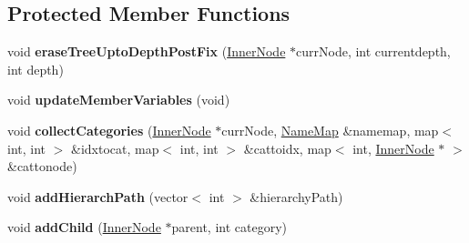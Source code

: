 \subsection*{Protected Member Functions}
\begin{DoxyCompactItemize}
\item 
\hypertarget{classMultiBoost_1_1ClassHierarchy_a558e78fc8235af81be08a48c0720ec46}{void {\bfseries erase\-Tree\-Upto\-Depth\-Post\-Fix} (\hyperlink{classMultiBoost_1_1InnerNode}{Inner\-Node} $\ast$curr\-Node, int currentdepth, int depth)}\label{classMultiBoost_1_1ClassHierarchy_a558e78fc8235af81be08a48c0720ec46}

\item 
\hypertarget{classMultiBoost_1_1ClassHierarchy_a7c603ee66515df82bc79d5e351c76ace}{void {\bfseries update\-Member\-Variables} (void)}\label{classMultiBoost_1_1ClassHierarchy_a7c603ee66515df82bc79d5e351c76ace}

\item 
\hypertarget{classMultiBoost_1_1ClassHierarchy_a027a51cfc1dde9155446b80129a27cff}{void {\bfseries collect\-Categories} (\hyperlink{classMultiBoost_1_1InnerNode}{Inner\-Node} $\ast$curr\-Node, \hyperlink{classMultiBoost_1_1NameMap}{Name\-Map} \&namemap, map$<$ int, int $>$ \&idxtocat, map$<$ int, int $>$ \&cattoidx, map$<$ int, \hyperlink{classMultiBoost_1_1InnerNode}{Inner\-Node} $\ast$ $>$ \&cattonode)}\label{classMultiBoost_1_1ClassHierarchy_a027a51cfc1dde9155446b80129a27cff}

\item 
\hypertarget{classMultiBoost_1_1ClassHierarchy_a09b49aa97c19e4b570b652c1516fa44d}{void {\bfseries add\-Hierarch\-Path} (vector$<$ int $>$ \&hierarchy\-Path)}\label{classMultiBoost_1_1ClassHierarchy_a09b49aa97c19e4b570b652c1516fa44d}

\item 
\hypertarget{classMultiBoost_1_1ClassHierarchy_a0e7ae73fe84ea4ea5365463bf72e00fc}{void {\bfseries add\-Child} (\hyperlink{classMultiBoost_1_1InnerNode}{Inner\-Node} $\ast$parent, int category)}\label{classMultiBoost_1_1ClassHierarchy_a0e7ae73fe84ea4ea5365463bf72e00fc}

\end{DoxyCompactItemize}
